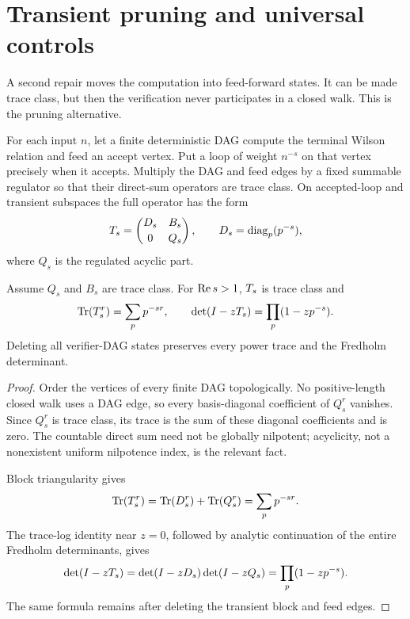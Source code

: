 \section{Transient pruning and universal controls}
\label{sec:transient-controls}

A second repair moves the computation into feed-forward states.  It can be
made trace class, but then the verification never participates in a closed
walk.  This is the pruning alternative.

For each input $n$, let a finite deterministic DAG compute the terminal
Wilson relation and feed an accept vertex.  Put a loop of weight $n^{-s}$ on
that vertex precisely when it accepts.  Multiply the DAG and feed edges by a
fixed summable regulator so that their direct-sum operators are trace class.
On accepted-loop and transient subspaces the full operator has the form
\[
  T_s=\begin{pmatrix}
      D_s&B_s\\[2pt]
      0&Q_s
    \end{pmatrix},
  \qquad D_s=\operatorname{diag}_{p}(p^{-s}),
\]
where $Q_s$ is the regulated acyclic part.

\begin{proposition}
\label{prop:transient-pruning}
Assume $Q_s$ and $B_s$ are trace class.  For $\operatorname{Re} s>1$, $T_s$ is trace
class and
\[
  \operatorname{Tr}(T_s^r)=\sum_p p^{-sr},\qquad
  \det(I-zT_s)=\prod_p(1-zp^{-s}).
\]
Deleting all verifier-DAG states preserves every power trace and the
Fredholm determinant.
\end{proposition}

\begin{proof}
Order the vertices of every finite DAG topologically.  No positive-length
closed walk uses a DAG edge, so every basis-diagonal coefficient of $Q_s^r$
vanishes.  Since $Q_s^r$ is trace class, its trace is the sum of these
diagonal coefficients and is zero.  The countable direct sum need not be
globally nilpotent; acyclicity, not a nonexistent uniform nilpotence index, is
the relevant fact.

Block triangularity gives
\[
  \operatorname{Tr}(T_s^r)
  =\operatorname{Tr}(D_s^r)+\operatorname{Tr}(Q_s^r)
  =\sum_p p^{-sr}.
\]
The trace-log identity near $z=0$, followed by analytic continuation of the
entire Fredholm determinants, gives
\[
  \det(I-zT_s)=\det(I-zD_s)\det(I-zQ_s)
  =\prod_p(1-zp^{-s}).
\]
The same formula remains after deleting the transient block and feed edges.
\end{proof}

